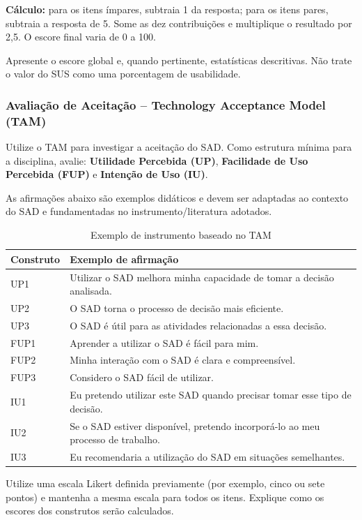 \documentclass[12pt]{article}
\begin{document}
\textbf{Cálculo:}
para os itens ímpares, subtraia 1 da resposta; para os itens pares, subtraia a resposta de 5. Some as dez contribuições e multiplique o resultado por 2,5. O escore final varia de 0 a 100.

Apresente o escore global e, quando pertinente, estatísticas descritivas. Não trate o valor do SUS como uma porcentagem de usabilidade.

\subsubsection{Avaliação de Aceitação -- Technology Acceptance Model (TAM)}

Utilize o TAM para investigar a aceitação do SAD. Como estrutura mínima para a disciplina, avalie:
\textbf{Utilidade Percebida (UP)}, \textbf{Facilidade de Uso Percebida (FUP)} e \textbf{Intenção de Uso (IU)}.

As afirmações abaixo são exemplos didáticos e devem ser adaptadas ao contexto do SAD e fundamentadas no instrumento/literatura adotados.

\begin{table}[!ht]
\centering
\caption{Exemplo de instrumento baseado no TAM}
\label{tab:tam}
\begin{tabular}{p{2.0cm}p{9.2cm}}
\toprule
\textbf{Construto} & \textbf{Exemplo de afirmação} \\
\midrule
UP1 & Utilizar o SAD melhora minha capacidade de tomar a decisão analisada. \\
UP2 & O SAD torna o processo de decisão mais eficiente. \\
UP3 & O SAD é útil para as atividades relacionadas a essa decisão. \\
FUP1 & Aprender a utilizar o SAD é fácil para mim. \\
FUP2 & Minha interação com o SAD é clara e compreensível. \\
FUP3 & Considero o SAD fácil de utilizar. \\
IU1 & Eu pretendo utilizar este SAD quando precisar tomar esse tipo de decisão. \\
IU2 & Se o SAD estiver disponível, pretendo incorporá-lo ao meu processo de trabalho. \\
IU3 & Eu recomendaria a utilização do SAD em situações semelhantes. \\
\bottomrule
\end{tabular}
\end{table}

Utilize uma escala Likert definida previamente (por exemplo, cinco ou sete pontos) e mantenha a mesma escala para todos os itens. Explique como os escores dos construtos serão calculados.
\end{document}
